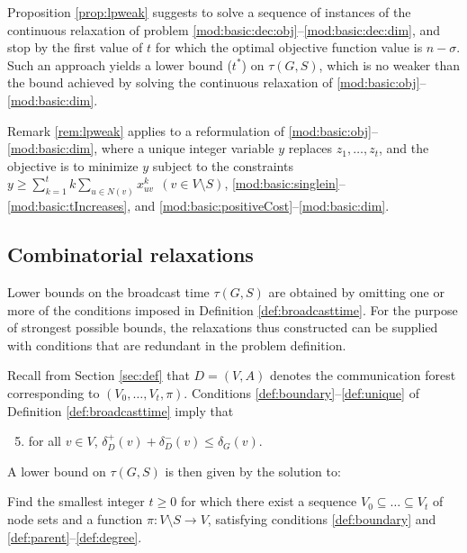 \begin{remark} \label{rem:lpweak}
Proposition \ref{prop:lpweak} suggests to solve a sequence of instances of the continuous relaxation of problem \eqref{mod:basic:dec:obj}--\eqref{mod:basic:dec:dim},
and stop by the first value of $t$ for which the optimal objective function value is $n-\sigma$.
Such an approach yields a lower bound ($t^{\ast}$) on $\tau(G,S)$,
which is no weaker than the bound achieved by solving the continuous relaxation of \eqref{mod:basic:obj}--\eqref{mod:basic:dim}.
\end{remark}

\begin{remark} \label{rem:otheropt}
Remark \ref{rem:lpweak} applies to a reformulation of \eqref{mod:basic:obj}--\eqref{mod:basic:dim}, where a unique integer variable $y$ replaces $z_1,\ldots,z_t$,
and the objective is to minimize $y$ subject to the constraints
$y\geq\sum\limits_{k=1}^tk\sum\limits_{u \in N(v)}x_{uv}^k ~~(v\in V\setminus S)$, \eqref{mod:basic:singlein}--\eqref{mod:basic:tIncreases},
and \eqref{mod:basic:positiveCost}--\eqref{mod:basic:dim}.
\end{remark}

\subsection{Combinatorial relaxations} \label{sec:lbcombrel}

Lower bounds on the broadcast time $\tau(G,S)$ are obtained by omitting one or more of the conditions imposed in Definition \ref{def:broadcasttime}.
For the purpose of strongest possible bounds, the relaxations thus constructed can be supplied with conditions that are redundant in the problem definition.

Recall from Section \ref{sec:def} that $D=(V,A)$ denotes the communication forest corresponding to $\left(V_0,\ldots,V_t,\pi\right)$.
Conditions \ref{def:boundary}--\ref{def:unique} of Definition \ref{def:broadcasttime} imply that
\begin{enumerate}
\setcounter{enumi}{4}
  \item for all $v\in V$, $\delta_D^+(v)+\delta_D^-(v)\leq\delta_G(v)$. \label{def:degree}
\end{enumerate}

\noindent
A lower bound on $\tau(G,S)$ is then given by the solution to:
\begin{problem}\label{prob:degree}
Find the smallest integer $t\geq 0$ for which there exist
a sequence $V_0\subseteq\dots\subseteq V_t$ of node sets and a function $\pi:V\setminus S\to V$,
satisfying conditions \ref{def:boundary} and \ref{def:parent}--\ref{def:degree}.
\end{problem}

